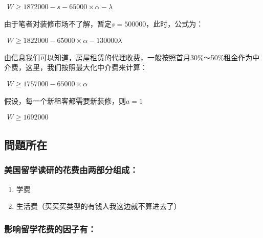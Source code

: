\documentclass[11pt]{article}
\providecommand{\tightlist}{%
      \setlength{\itemsep}{0pt}\setlength{\parskip}{0pt}}
\begin{document}
\(\begin{align*}W \geq 1872000 - s - 65000 \times \alpha - \lambda \end{align*}\)

由于笔者对装修市场不了解，暂定\(s = 500000\)，此时，公式为：

\(\begin{align*}W \geq 1822000 - 65000 \times \alpha - 130000\lambda \end{align*}\)

由信息我们可以知道，房屋租赁的代理收费，一般按照首月30\%～50\%租金作为中介费，这里，我们按照最大化中介费来计算：

\(\begin{align*}W \geq 1757000 - 65000 \times \alpha \end{align*}\)

假设，每一个新租客都需要新装修，则\(a = 1\)

\(\begin{align*}W \geq 1692000 \end{align*}\)

    \hypertarget{ux554fux984cux6240ux5728}{%
\subsection{問題所在}\label{ux554fux984cux6240ux5728}}

\hypertarget{ux7f8eux56fdux7559ux5b66ux8bfbux7814ux7684ux82b1ux8d39ux7531ux4e24ux90e8ux5206ux7ec4ux6210}{%
\subsubsection{美国留学读研的花费由两部分组成：}\label{ux7f8eux56fdux7559ux5b66ux8bfbux7814ux7684ux82b1ux8d39ux7531ux4e24ux90e8ux5206ux7ec4ux6210}}

\begin{enumerate}
\def\labelenumi{\arabic{enumi}.}
\tightlist
\item
  学费
\item
  生活费（买买买类型的有钱人我这边就不算进去了）
\end{enumerate}

\hypertarget{ux5f71ux54cdux7559ux5b66ux82b1ux8d39ux7684ux56e0ux5b50ux6709}{%
\subsubsection{影响留学花费的因子有：}\label{ux5f71ux54cdux7559ux5b66ux82b1ux8d39ux7684ux56e0ux5b50ux6709}}
\end{document}

